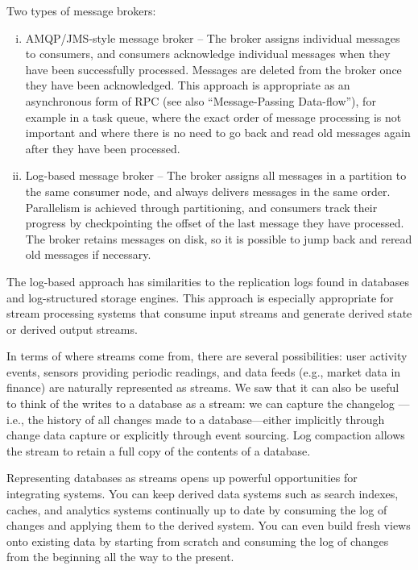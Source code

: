 \documentclass{article}
\begin{document}
    Two types of message brokers:
    \begin{enumerate}[i.]
        \item AMQP/JMS-style message broker -- The broker assigns individual messages to consumers, and consumers acknowledge individual messages when they have been successfully processed. Messages are deleted from the broker once they have been acknowledged. This approach is appropriate as an asynchronous form of RPC (see also ``Message-Passing Data-flow”), for example in a task queue, where the exact order of message processing is not important and where there is no need to go back and read old messages again after they have been processed.
        
        \item Log-based message broker -- The broker assigns all messages in a partition to the same consumer node, and always delivers messages in the same order. Parallelism is achieved through partitioning, and consumers track their progress by checkpointing the offset of the last message they have processed. The broker retains messages on disk, so it is possible to jump back and reread old messages if necessary.
        
    \end{enumerate}
    The log-based approach has similarities to the replication logs found in databases and log-structured storage engines. This approach is especially appropriate for stream processing systems that consume input streams and generate derived state or derived output streams.
    
    In terms of where streams come from, there are several possibilities: user activity events, sensors providing periodic readings, and data feeds (e.g., market data in finance) are naturally represented as streams. We saw that it can also be useful to think of the writes to a database as a stream: we can capture the changelog — i.e., the history of all changes made to a database—either implicitly through change data capture or explicitly through event sourcing. Log compaction allows the stream to retain a full copy of the contents of a database.

    Representing databases as streams opens up powerful opportunities for integrating systems. You can keep derived data systems such as search indexes, caches, and analytics systems continually up to date by consuming the log of changes and applying them to the derived system. You can even build fresh views onto existing data by starting from scratch and consuming the log of changes from the beginning all the way to the present.
\end{document}
